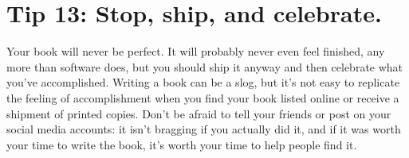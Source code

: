 \documentclass[10pt,letterpaper]{article}
\begin{document}
\section*{Tip 13: Stop, ship, and celebrate.}

Your book will never be perfect.
It will probably never even feel finished,
any more than software does,
but you should ship it anyway
and then celebrate what you've accomplished.
Writing a book can be a slog,
but it's not easy to replicate the feeling of accomplishment
when you find your book listed online or receive a shipment of printed copies.
Don't be afraid to tell your friends or post on your social media accounts:
it isn't bragging if you actually did it,
and if it was worth your time to write the book,
it's worth your time to help people find it.



\end{document}
